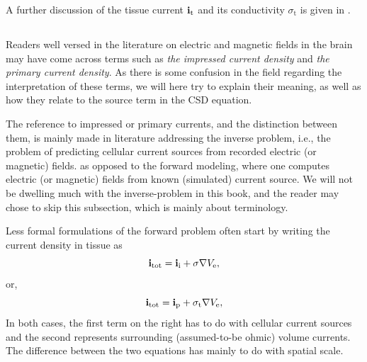 A further discussion of the tissue current ${\bf i}_\text{t}$ and its conductivity $\sigma_\text{t}$
is given in .



\subsection{}
\label{sec:VC:C4}
Readers well versed in the literature on electric and magnetic fields in the brain
may have come across terms such as \textit{the impressed current density}
and \textit{the primary current density}.
As there is some confusion in the field regarding the interpretation of these terms, 
we will here try to explain their meaning, as well as how they relate to the source term in the CSD equation.

The reference to impressed or primary currents, and the distinction between them, 
is mainly made in literature addressing the inverse problem, 
i.e., the problem of predicting cellular current sources from recorded electric (or magnetic) fields.
as opposed to the forward modeling, where one computes electric (or magnetic) fields
from known (simulated) current source.
We will not be dwelling much with the inverse-problem in this book, 
and the reader may chose to skip this subsection, which is mainly about terminology. 

Less formal formulations of the forward problem often start by writing the current density in tissue as
\begin{equation}
{\bf i_\text{tot}} =  {\bf i}_\mathrm{i} + \sigma {\bf \nabla} V_\mathrm{e}, 
\label{eq:VC:inverse1}
\end{equation}
or, 
\begin{equation}
{\bf i_\text{tot}} = {\bf i}_\mathrm{p} + \sigma_\text{t} {\bf \nabla} V_\mathrm{e}, 
\label{eq:VC:inverse2}
\end{equation}
In both cases, the first term on the right has to do with cellular current sources
and the second represents surrounding (assumed-to-be ohmic) volume currents.
The difference between the two equations has mainly to do with spatial scale. 

